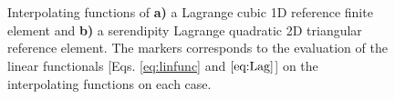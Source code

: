 \begin{figure}[b!]
    \hspace*{-.5\textwidth}
    \vspace*{7.5em}%
     \begin{subfigure}{\textwidth}\caption{ }\label{fig:ExampleElements:a}\end{subfigure}\\
    \hspace*{-.7\textwidth}
     \begin{subfigure}{\textwidth}\caption{ }\label{fig:ExampleElements:b}\end{subfigure}
     \vspace*{-11.5em}\\
    \centering
    \scriptsize
    \def\svgwidth{.9\textwidth}
\caption[Example of interpolating functions for 1D and 2D finite element]{Interpolating functions of \textbf{a)} a Lagrange cubic 1D reference finite element and \textbf{b)} a serendipity Lagrange quadratic 2D triangular reference element. The markers corresponds to the evaluation of the linear functionals [Eqs. \eqref{eq:linfunc} and $\eqref{eq:Lag}$] on the interpolating functions on each case.}
\label{fig:ExampleElements}
\end{figure}
